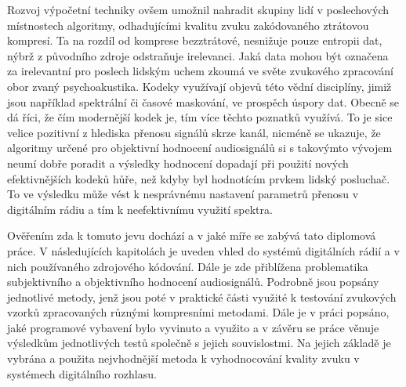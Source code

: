 Rozvoj výpočetní techniky ovšem umožnil nahradit skupiny lidí v poslechových místnostech algoritmy, odhadujícími kvalitu zvuku zakódovaného ztrátovou kompresí. Ta na rozdíl od komprese bezztrátové, nesnižuje pouze entropii dat, nýbrž z původního zdroje odstraňuje irelevanci. Jaká data mohou být označena za irelevantní pro poslech lidským uchem zkoumá ve světe zvukového zpracování obor zvaný psychoakustika. Kodeky využívají objevů této vědní disciplíny, jimiž jsou například spektrální či časové maskování, ve prospěch úspory dat. Obecně se dá říci, že čím modernější kodek je, tím více těchto poznatků využívá. To je sice velice pozitivní z hlediska přenosu signálů skrze kanál, nicméně se ukazuje, že algoritmy určené pro objektivní hodnocení audiosignálů si s takovýmto vývojem neumí dobře poradit a výsledky hodnocení dopadají při použití nových efektivnějších kodeků hůře, než kdyby byl hodnotícím prvkem lidský posluchač. To ve výsledku může vést k nesprávnému nastavení parametrů přenosu v digitálním rádiu a tím k neefektivnímu využití spektra. 

Ověřením zda k tomuto jevu dochází a v jaké míře se zabývá tato diplomová práce. V následujících kapitolách je uveden vhled do systémů digitálních rádií a v nich používaného zdrojového kódování. Dále je zde přiblížena problematika subjektivního a objektivního hodnocení audiosignálů. Podrobně jsou popsány jednotlivé metody, jenž jsou poté v praktické části využité k testování zvukových vzorků zpracovaných různými kompresními metodami. Dále je v práci popsáno, jaké programové vybavení bylo vyvinuto a využito a v závěru se práce věnuje výsledkům jednotlivých testů společně s jejich souvislostmi. Na jejich základě je vybrána a použita nejvhodnější metoda k vyhodnocování kvality zvuku v systémech digitálního rozhlasu.
